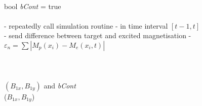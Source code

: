 \documentclass{nic-series}
\begin{document}
\begin{algorithm}[h]
{\begin{minipage}[t]{6cm}
\begin{algorithmic}[1]
  	  \ \\
        \STATE bool {\it bCont} = true \\
  	  \ \\
  	  {\tiny\sf - repeatedly call simulation routine -}
	      in time interval $[t-1,t]$\\
  	     {\tiny\sf - send difference between target and excited magnetisation -}
	     \SEND $\varepsilon_n=\sum |M_p(x_i)-M_e(x_i,t)|$\\
  	     \ \\
  	     \ \\
  	     \ \\
  	     \RECEIVE $(B_{1x},B_{1y})$ and {\it bCont} \\
	     ($B_{1x},B_{1y}$)
  	  \ENDWHILE\\
  	  \ \\
  	\ENDFOR\\
  	\ \\
 	\end{algorithmic}
 \end{minipage}\hfill
 }
\end{algorithm}
\end{document}
